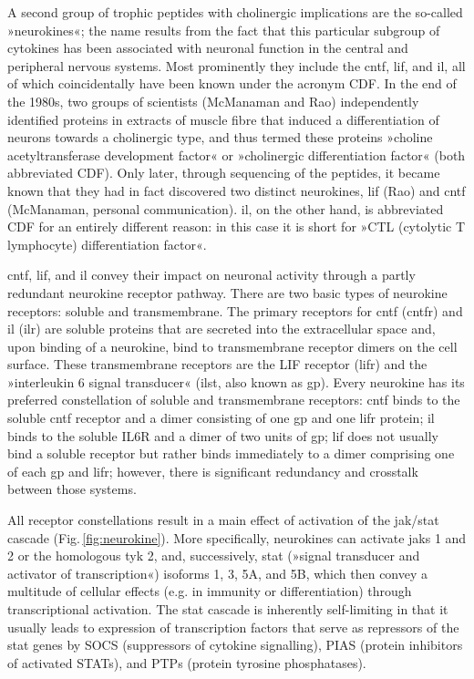 A second group of trophic peptides with cholinergic implications are the so-called »neurokines«; the name results from the fact that this particular subgroup of cytokines has been associated with neuronal function in the central and peripheral nervous systems. Most prominently they include the \ac{cntf}, \ac{lif}, and \ac{il}, all of which coincidentally have been known under the acronym CDF. In the end of the 1980s, two groups of scientists (McManaman\cite{McManaman1988} and Rao\cite{Rao1992}) independently identified proteins in extracts of muscle fibre that induced a differentiation of neurons towards a cholinergic type, and thus termed these proteins »choline acetyltransferase development factor« or »cholinergic differentiation factor« (both abbreviated CDF). Only later, through sequencing of the peptides, it became known that they had in fact discovered two distinct neurokines, \ac{lif} (Rao) and \ac{cntf} (McManaman, personal communication). \ac{il}, on the other hand, is abbreviated CDF for an entirely different reason: in this case it is short for »CTL (cytolytic T lymphocyte) differentiation factor«.

\ac{cntf}, \ac{lif}, and \ac{il} convey their impact on neuronal activity through a partly redundant neurokine receptor pathway\cite{Berger2014}. There are two basic types of neurokine receptors: soluble and transmembrane. The primary receptors for \ac{cntf} (\acs{cntfr}) and \ac{il} (\acs{ilr}) are soluble proteins that are secreted into the extracellular space and, upon binding of a neurokine, bind to transmembrane receptor dimers on the cell surface. These transmembrane receptors are the LIF receptor (\acs{lifr}) and the »interleukin 6 signal transducer« (\acs{ilst}, also known as \acs{gp}). Every neurokine has its preferred constellation of soluble and transmembrane receptors: \ac{cntf} binds to the soluble \ac{cntf} receptor and a dimer consisting of one \ac{gp} and one \ac{lifr} protein; \ac{il} binds to the soluble IL6R and a dimer of two units of \ac{gp}; \ac{lif} does not usually bind a soluble receptor but rather binds immediately to a dimer comprising one of each \ac{gp} and \ac{lifr}; however, there is significant redundancy and crosstalk between those systems\cite{Rawlings2004,Nathanson2012}.

All receptor constellations result in a main effect of activation of the \acs{jak}/\acs{stat} cascade (Fig.\,\ref{fig:neurokine}). More specifically, neurokines can activate \acfp{jak} 1 and 2 or the homologous \ac{tyk} 2, and, successively, \ac{stat} (»signal transducer and activator of transcription«) isoforms 1, 3, 5A, and 5B, which then convey a multitude of cellular effects (e.g. in immunity or differentiation) through transcriptional activation. The \ac{stat} cascade is inherently self-limiting in that it usually leads to expression of transcription factors that serve as repressors of the \ac{stat} genes by SOCS (suppressors of cytokine signalling), PIAS (protein inhibitors of activated STATs), and PTPs (protein tyrosine phosphatases)\cite{Rawlings2004}. 

